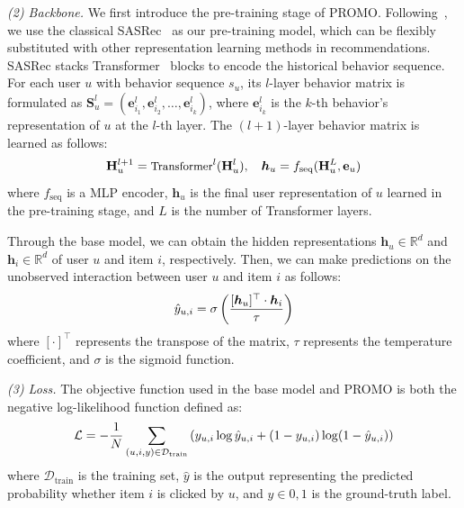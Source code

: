 \documentclass[sigconf]{acmart}
\newcommand{\sys}{\textsc{PROMO}\xspace}
\begin{document}
\textit{(2) Backbone.} We first introduce the pre-training stage of \sys. Following~\cite{wu2024personalized}, we use the classical SASRec~\cite{kang2018self} as our pre-training model, which can be flexibly substituted with other representation learning methods in recommendations. 
SASRec stacks Transformer~\cite{vaswani2017attention} blocks to encode the historical behavior sequence. 
For each user $u$ with behavior sequence $s_u$, its $l$-layer behavior matrix is formulated as $\mathbf{S}_u^l = (\mathbf{e}_{i_1}^l, \mathbf{e}_{i_2}^l, \ldots, \mathbf{e}_{i_k}^l)$, where $\mathbf{e}_{i_k}^l$ is the $k$-th behavior's representation of $u$ at the $l$-th layer. 
The $(l + 1)$-layer behavior matrix is learned as follows:
\begin{equation} \small
\mathbf{H}_u^{l+1} = \text{Transformer}^l(\mathbf{H}_u^l), \quad \bm{h}_u = f_{\text{seq}}(\mathbf{H}_u^{L},\mathbf{e}_u)
\end{equation}
where $f_{\text{seq}}$ is a MLP encoder, $\bm{h}_u$ is the final user representation of $u$ learned in the pre-training stage, and $L$ is the number of Transformer layers.

Through the base model, we can obtain the hidden representations $\mathbf{h}_u \in \mathbb{R}^d$ and $\mathbf{h}_i \in \mathbb{R}^d$ of user $u$ and item $i$, respectively. 
Then, we can make predictions on the unobserved interaction between user $u$ and item $i$ as follows:
\begin{equation} \small
\hat{y}_{u, i} = \sigma\left(\frac{[\bm{h}_u]^\top \cdot \bm{h}_i}{\tau}\right)
\end{equation}
where $[\cdot]^\top$ represents the transpose of the matrix, $\tau$ represents the temperature coefficient, and $\sigma$ is the sigmoid function.

\textit{(3) Loss.} The objective function used in the base model and \sys is both the negative log-likelihood function defined as:
\begin{equation} \small
\mathcal{L} = -\frac{1}{N}\sum_{(u, i, y) \in \mathcal{D}_{\text{train}}} \left(y_{u, i} \log \hat{y}_{u, i} + (1 - y_{u, i}) \log (1 - \hat{y}_{u, i})\right)
\label{rec}
\end{equation}
where $\mathcal{D}_{\text{train}}$ is the training set, $\hat{y}$ is the output representing the predicted probability whether item $i$ is clicked by $u$, and $y \in {0, 1}$ is the ground-truth label.
\end{document}
